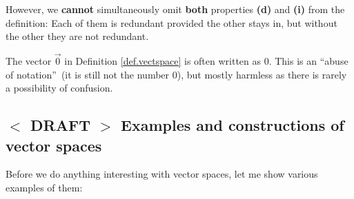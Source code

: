 \documentclass[numbers=enddot,12pt,final,onecolumn,notitlepage]{scrartcl}%
\theoremstyle{definition}
\begin{document}
However, we \textbf{cannot} simultaneously omit \textbf{both} properties
\textbf{(d)} and \textbf{(i)} from the definition: Each of them is redundant
provided the other stays in, but without the other they are not redundant.

The vector $\overrightarrow{0}$ in Definition \ref{def.vectspace} is often
written as $0$. This is an \textquotedblleft abuse of
notation\textquotedblright\ (it is still not the number $0$), but mostly
harmless as there is rarely a possibility of confusion.

\subsection{%
$<$%
DRAFT%
$>$
Examples and constructions of vector spaces}

Before we do anything interesting with vector spaces, let me show various
examples of them:
\end{document}
